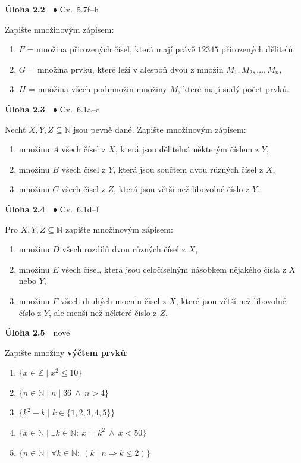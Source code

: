 \documentclass[11pt,a4paper]{article}
\newcommand{\N}{\mathbb N}\newcommand{\Z}{\mathbb Z}\newcommand{\Pot}{\mathcal P}
\newcommand{\pr}{\mathrel{\mid}}\newcommand{\nepr}{\mathrel{\nmid}}\newcommand{\sm}{\setminus}
\newenvironment{pol}{\begin{enumerate}[label=(\alph*),leftmargin=2em,itemsep=3pt]}{\end{enumerate}}
\newenvironment{uloha}[2]{\Needspace{6\baselineskip}\par\vspace{6pt}\noindent\textbf{Úloha #1}\ \ {\footnotesize\color{gray}#2}\par\vspace{2pt}}{\par\vspace{4pt}}
\begin{document}
\begin{uloha}{2.2}{$\blacklozenge$ Cv.~5.7f--h}
Zapište množinovým zápisem:
\begin{pol}
  \item $F$ = množina přirozených čísel, která mají právě $12345$ přirozených dělitelů,
  \item $G$ = množina prvků, které leží v alespoň dvou z množin $M_1,M_2,\dots,M_n$,
  \item $H$ = množina všech podmnožin množiny $M$, které mají sudý počet prvků.
\end{pol}


\end{uloha}

\begin{uloha}{2.3}{$\blacklozenge$ Cv.~6.1a--c}
Nechť $X,Y,Z\subseteq\N$ jsou pevně dané. Zapište množinovým zápisem:
\begin{pol}
  \item množinu $A$ všech čísel z $X$, která jsou dělitelná některým číslem z $Y$,
  \item množinu $B$ všech čísel z $Y$, která jsou součtem dvou různých čísel z $X$,
  \item množinu $C$ všech čísel z $Z$, která jsou větší než libovolné číslo z $Y$.
\end{pol}

\end{uloha}

\begin{uloha}{2.4}{$\blacklozenge$ Cv.~6.1d--f}
Pro $X,Y,Z\subseteq\N$ zapište množinovým zápisem:
\begin{pol}
  \item množinu $D$ všech rozdílů dvou různých čísel z $X$,
  \item množinu $E$ všech čísel, která jsou celočíselným násobkem nějakého čísla z $X$ nebo $Y$,
  \item množinu $F$ všech druhých mocnin čísel z $X$, které jsou větší než libovolné číslo z $Y$, ale menší než některé číslo z $Z$.
\end{pol}


\end{uloha}

\begin{uloha}{2.5}{nové}
Zapište množiny \textbf{výčtem prvků}:
\begin{pol}
  \item $\{x\in\Z\mid x^2\le10\}$
  \item $\{n\in\N\mid n\pr36\ \land\ n>4\}$
  \item $\{k^2-k\mid k\in\{1,2,3,4,5\}\}$
  \item $\{x\in\N\mid \exists k\in\N:\ x=k^2\ \land\ x<50\}$
  \item $\{n\in\N\mid \forall k\in\N:\ (k\pr n\Rightarrow k\le2)\}$
\end{pol}

\end{uloha}
\end{document}
